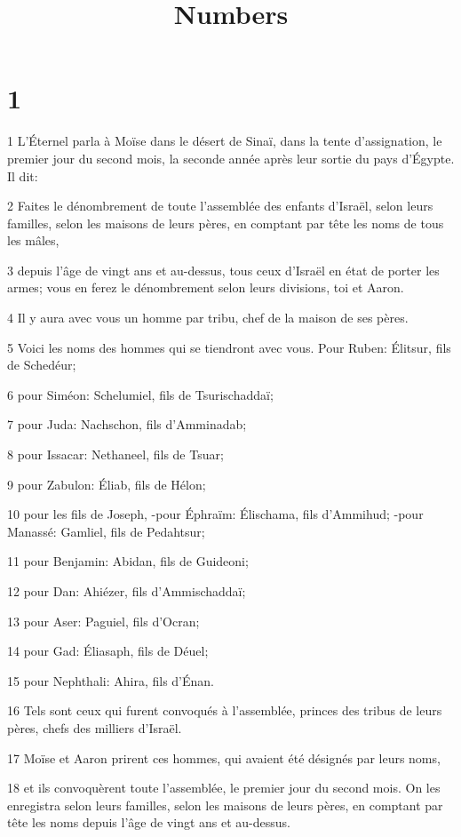 

\title{Numbers}


\chapter{1}

\par 1 L'Éternel parla à Moïse dans le désert de Sinaï, dans la tente d'assignation, le premier jour du second mois, la seconde année après leur sortie du pays d'Égypte. Il dit:
\par 2 Faites le dénombrement de toute l'assemblée des enfants d'Israël, selon leurs familles, selon les maisons de leurs pères, en comptant par tête les noms de tous les mâles,
\par 3 depuis l'âge de vingt ans et au-dessus, tous ceux d'Israël en état de porter les armes; vous en ferez le dénombrement selon leurs divisions, toi et Aaron.
\par 4 Il y aura avec vous un homme par tribu, chef de la maison de ses pères.
\par 5 Voici les noms des hommes qui se tiendront avec vous. Pour Ruben: Élitsur, fils de Schedéur;
\par 6 pour Siméon: Schelumiel, fils de Tsurischaddaï;
\par 7 pour Juda: Nachschon, fils d'Amminadab;
\par 8 pour Issacar: Nethaneel, fils de Tsuar;
\par 9 pour Zabulon: Éliab, fils de Hélon;
\par 10 pour les fils de Joseph, -pour Éphraïm: Élischama, fils d'Ammihud; -pour Manassé: Gamliel, fils de Pedahtsur;
\par 11 pour Benjamin: Abidan, fils de Guideoni;
\par 12 pour Dan: Ahiézer, fils d'Ammischaddaï;
\par 13 pour Aser: Paguiel, fils d'Ocran;
\par 14 pour Gad: Éliasaph, fils de Déuel;
\par 15 pour Nephthali: Ahira, fils d'Énan.
\par 16 Tels sont ceux qui furent convoqués à l'assemblée, princes des tribus de leurs pères, chefs des milliers d'Israël.
\par 17 Moïse et Aaron prirent ces hommes, qui avaient été désignés par leurs noms,
\par 18 et ils convoquèrent toute l'assemblée, le premier jour du second mois. On les enregistra selon leurs familles, selon les maisons de leurs pères, en comptant par tête les noms depuis l'âge de vingt ans et au-dessus.
